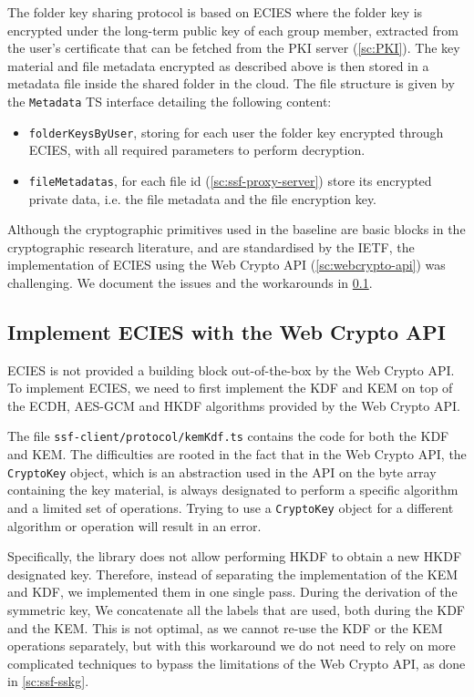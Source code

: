 The folder key sharing protocol is based on ECIES where the folder key
is encrypted under the long-term public key of each group member,
extracted from the user's certificate that can be fetched
from the PKI server (\cref{sc:PKI}).
The key material and file metadata encrypted as described above is
then stored in a metadata file inside the shared folder in the cloud.
The file structure is given by the \texttt{Metadata} TS interface
detailing the following content:
\begin{itemize}
    \item \texttt{folderKeysByUser}, storing for each user the folder key encrypted through ECIES, with all required parameters to perform decryption.
    \item \texttt{fileMetadatas}, for each file id (\cref{sc:ssf-proxy-server}) store its encrypted private data, i.e. the file metadata and the file encryption key.
\end{itemize}

Although the cryptographic primitives used in the baseline are
basic blocks in the cryptographic research literature,
and are standardised by the IETF, the implementation of
ECIES using the Web Crypto API (\cref{sc:webcrypto-api}) was challenging.
We document the issues and the workarounds in \cref{sc:implement-ecies}.

\subsection{Implement ECIES with the Web Crypto API}\label{sc:implement-ecies}

ECIES is not provided a building block out-of-the-box by the Web Crypto API.
To implement ECIES, we need to first implement 
the KDF and KEM on top of the ECDH, AES-GCM and HKDF algorithms provided
by the Web Crypto API.

The file \texttt{ssf-client/protocol/kemKdf.ts} contains the code for both the KDF and KEM.
The difficulties are rooted in the fact that
in the Web Crypto API, the \texttt{CryptoKey}
object, which is an abstraction used in the API on the byte array containing the key material,
is always designated to perform a specific algorithm and
a limited set of operations.
Trying to use a \texttt{CryptoKey} object for a different algorithm or operation
will result in an error.

Specifically, the library does not allow performing 
HKDF to obtain a new HKDF designated key.
Therefore, instead of separating the implementation
of the KEM and KDF, we implemented them in one single pass.
During the derivation of the symmetric key,
We concatenate all the labels that are used, both
during the KDF and the KEM. This is not optimal,
as we cannot re-use the KDF or the KEM operations
separately, but with this workaround we do not need
to rely on more complicated techniques 
to bypass the limitations of the Web Crypto API,
as done in \cref{sc:ssf-sskg}.

